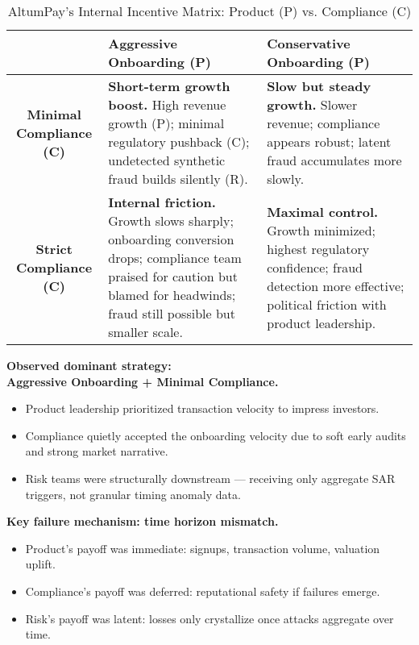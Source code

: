\begin{table}[H]
\centering
\renewcommand{\arraystretch}{1.4}
\begin{tabular}{|c|p{4.2cm}|p{4.2cm}|}
\hline
 & \textbf{Aggressive Onboarding (P)} & \textbf{Conservative Onboarding (P)} \\
\hline
\textbf{Minimal Compliance (C)} 
& \textbf{Short-term growth boost.} \newline High revenue growth (P); minimal regulatory pushback (C); undetected synthetic fraud builds silently (R). 
& \textbf{Slow but steady growth.} \newline Slower revenue; compliance appears robust; latent fraud accumulates more slowly.
\\
\hline
\textbf{Strict Compliance (C)} 
& \textbf{Internal friction.} \newline Growth slows sharply; onboarding conversion drops; compliance team praised for caution but blamed for headwinds; fraud still possible but smaller scale.
& \textbf{Maximal control.} \newline Growth minimized; highest regulatory confidence; fraud detection more effective; political friction with product leadership.
\\
\hline
\end{tabular}
\caption{AltumPay's Internal Incentive Matrix: Product (P) vs. Compliance (C)}
\end{table}

\medskip

\textbf{Observed dominant strategy:} \\
\textbf{Aggressive Onboarding + Minimal Compliance.}

\begin{itemize}
  \item Product leadership prioritized transaction velocity to impress investors.
  \item Compliance quietly accepted the onboarding velocity due to soft early audits and strong market narrative.
  \item Risk teams were structurally downstream — receiving only aggregate SAR triggers, not granular timing anomaly data.
\end{itemize}

\medskip

\textbf{Key failure mechanism: time horizon mismatch.}

\begin{itemize}
  \item Product’s payoff was immediate: signups, transaction volume, valuation uplift.
  \item Compliance’s payoff was deferred: reputational safety if failures emerge.
  \item Risk’s payoff was latent: losses only crystallize once attacks aggregate over time.
\end{itemize}

